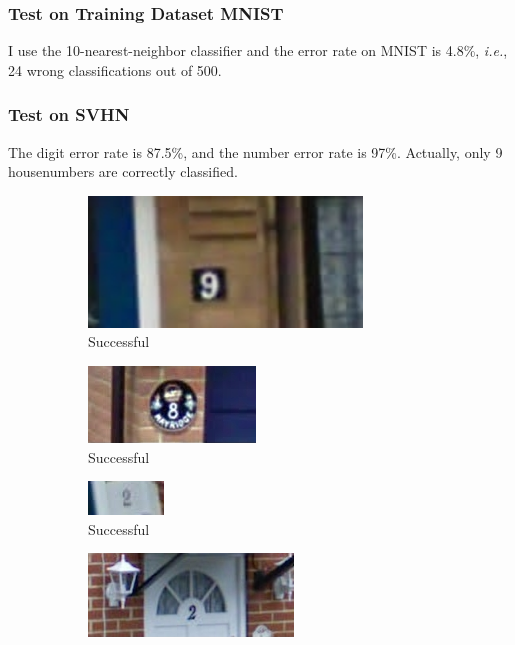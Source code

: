 \subsubsection{Test on Training Dataset MNIST}
I use the 10-nearest-neighbor classifier and the error rate on MNIST is 4.8\%, \textit{i.e.}, 24 wrong classifications out of 500.
\subsubsection{Test on SVHN}
The digit error rate is 87.5\%, and the number error rate is 97\%.
Actually, only 9 housenumbers are correctly classified.
\begin{figure}[htbp]
	\centering
	\begin{subfigure}[t]{0.4\textwidth}
	    \centering
		\includegraphics[width=0.8\textwidth]{hw4/problem2/23.png}
		\caption{Successful}\label{fig:16a}
	\end{subfigure}
	\qquad
	\begin{subfigure}[t]{0.4\textwidth}
	    \centering
		\includegraphics{hw4/problem2/53.png}
		\caption{Successful}\label{fig:16b}
	\end{subfigure}
	\qquad
	\begin{subfigure}[t]{0.4\textwidth}
	    \centering
		\includegraphics{hw4/problem2/66.png}
		\caption{Successful}\label{fig:16c}
	\end{subfigure}
	\qquad
	\begin{subfigure}[t]{0.4\textwidth}
	    \centering
		\includegraphics[width=0.6\textwidth]{hw4/problem2/97.png}

\end{subfigure}
\end{figure}
